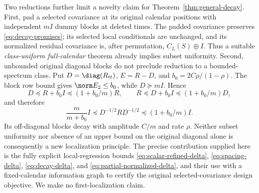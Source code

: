 Two reductions further limit a novelty claim for
Theorem~\ref{thm:general-decay}. First, pad a selected covariance at its
original calendar positions with independent $mI$ dummy blocks at deleted
times. The padded covariance preserves \eqref{eq:decay-promises}; its
selected local conditionals are unchanged, and its normalized residual
covariance is, after permutation, $C_L(S)\oplus I$. Thus a suitable
\emph{class-uniform full-calendar} theorem already implies subset uniformity.
Second, unbounded original diagonal blocks do not preclude reduction to a
bounded-spectrum class. Put $D=\diag(R_{tt})$, $E=R-D$, and
$b_0=2C\rho/(1-\rho)$. The block row bound gives $\norm E_2\le b_0$,
while $D\succeq mI$. Hence
\[
 D\preceq R+b_0I\preceq(1+b_0/m)R,
 \qquad R\preceq D+b_0I\preceq(1+b_0/m)D,
\]
and therefore
\begin{equation}
 \frac{m}{m+b_0}I\preceq D^{-1/2}RD^{-1/2}
            \preceq(1+b_0/m)I.
 \label{eq:diagonal-priority-reduction}
\end{equation}
Its off-diagonal blocks decay with amplitude $C/m$ and rate $\rho$.
Neither subset uniformity nor absence of an upper bound on the original
diagonal alone is consequently a new localization principle. The precise
contribution supplied here is the fully explicit local-regression bounds
\eqref{eq:scalar-refined-delta}, \eqref{eq:spacing-delta},
\eqref{eq:decay-delta}, and \eqref{eq:partial-normalized-delta}, and their
use with a fixed-calendar information graph to certify the original
selected-covariance design objective. We make no first-localization claim.
